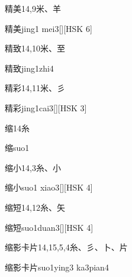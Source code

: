 \begin{entry}{精美}{14,9}{⽶、⽺}
  \begin{phonetics}{精美}{jing1 mei3}[][HSK 6]
  \end{phonetics}
\end{entry}

\begin{entry}{精致}{14,10}{⽶、⾄}
  \begin{phonetics}{精致}{jing1zhi4}
  \end{phonetics}
\end{entry}

\begin{entry}{精彩}{14,11}{⽶、⼺}
  \begin{phonetics}{精彩}{jing1cai3}[][HSK 3]
  \end{phonetics}
\end{entry}

\begin{entry}{缩}{14}{⽷}
  \begin{phonetics}{缩}{suo1}
  \end{phonetics}
\end{entry}

\begin{entry}{缩小}{14,3}{⽷、⼩}
  \begin{phonetics}{缩小}{suo1 xiao3}[][HSK 4]
  \end{phonetics}
\end{entry}

\begin{entry}{缩短}{14,12}{⽷、⽮}
  \begin{phonetics}{缩短}{suo1duan3}[][HSK 4]
  \end{phonetics}
\end{entry}

\begin{entry}{缩影卡片}{14,15,5,4}{⽷、⼺、⼘、⽚}
  \begin{phonetics}{缩影卡片}{suo1ying3 ka3pian4}
  \end{phonetics}
\end{entry}

